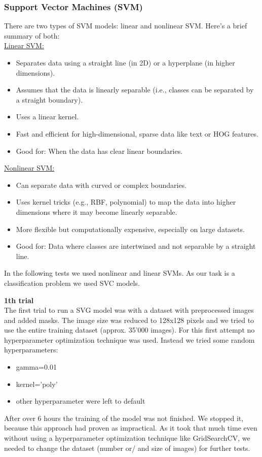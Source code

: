 \documentclass{article}
\begin{document}
\subsubsection{Support Vector Machines (SVM)}
There are two types of SVM models: linear and nonlinear SVM. Here's a brief summary of both: \\
\underline{Linear SVM:}
\begin{itemize}
    \item Separates data using a straight line (in 2D) or a hyperplane (in higher dimensions).
    \item Assumes that the data is linearly separable (i.e., classes can be separated by a straight boundary).
    \item Uses a linear kernel.
    \item Fast and efficient for high-dimensional, sparse data like text or HOG features.
    \item Good for: When the data has clear linear boundaries.
\end{itemize}
\underline{Nonlinear SVM:}
\begin{itemize}
    \item Can separate data with curved or complex boundaries.
    \item Uses kernel tricks (e.g., RBF, polynomial) to map the data into higher dimensions where it may become linearly separable.
    \item More flexible but computationally expensive, especially on large datasets.
    \item Good for: Data where classes are intertwined and not separable by a straight line.
\end{itemize}

In the following tests we used nonlinear and linear SVMs. As our task  is a classification problem we used SVC models.

\textbf{1th trial}\\
The first trial to run a SVG model was with a dataset with preprocessed images and added masks. The image size was reduced to 128x128 pixels and we tried 
to use the entire training dataset (approx. 35'000 images). For this first attempt no hyperparameter optimization technique was used. Instead we tried some random 
hyperparameters: 
\begin{itemize}
    \item gamma=0.01
    \item kernel='poly'
    \item other hyperparameter were left to default
\end{itemize}
After over 6 hours the training of the model was not finished. We stopped it, because this approach had proven as impractical. As it took that much time even without
using a hyperparameter optimization technique like GridSearchCV, we needed to change the dataset (number or/ and size of images) for further tests.
\end{document}
